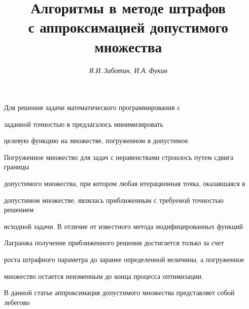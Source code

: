 




\author{\it Я.И.\,Заботин, И.А.\,Фукин}




\title{Алгоритмы в методе штрафов\\ с аппроксимацией допустимого множества}





\date{}




\pagestyle{plain} %







\maketitle


\label{begin}








Для решения задачи математического программирования с


заданной точностью в \cite{Zab} предлагалось минимизировать 


целевую функцию на множестве, погруженном в допустимое.


Погруженное множество для задач с неравенствами строилось путем сдвига границы


допустимого множества, при котором любая итерационная точка, оказавшаяся в


допустимом множестве, являлась приближенным с требуемой точностью решением


исходной задачи. В отличие от известного метода модифицированных функций


Лагранжа \cite{Gol} получение приближенного решения достигается только за счет


роста штрафного параметра до заранее определенной величины, а погруженное


множество остается неизменным до конца процесса оптимизации.





В данной статье аппроксимация допустимого множества представляет собой лебегово


